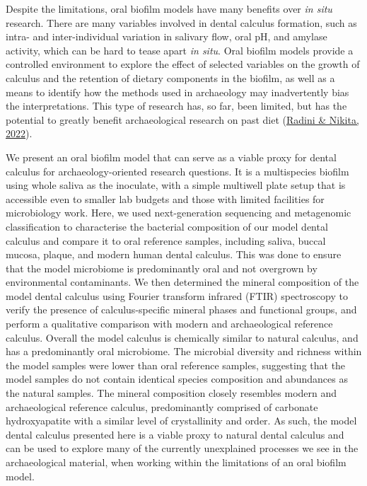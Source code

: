 \documentclass[
  b5paper,
]{book}
\begin{document}
Despite the limitations, oral biofilm models have many benefits over
\emph{in situ} research. There are many variables involved in dental
calculus formation, such as intra- and inter-individual variation in
salivary flow, oral pH, and amylase activity, which can be hard to tease
apart \emph{in situ}. Oral biofilm models provide a controlled
environment to explore the effect of selected variables on the growth of
calculus and the retention of dietary components in the biofilm, as well
as a means to identify how the methods used in archaeology may
inadvertently bias the interpretations. This type of research has, so
far, been limited, but has the potential to greatly benefit
archaeological research on past diet
(\protect\hyperlink{ref-radiniDirtyTeeth2022}{Radini \& Nikita, 2022}).

We present an oral biofilm model that can serve as a viable proxy for
dental calculus for archaeology-oriented research questions. It is a
multispecies biofilm using whole saliva as the inoculate, with a simple
multiwell plate setup that is accessible even to smaller lab budgets and
those with limited facilities for microbiology work. Here, we used
next-generation sequencing and metagenomic classification to
characterise the bacterial composition of our model dental calculus and
compare it to oral reference samples, including saliva, buccal mucosa,
plaque, and modern human dental calculus. This was done to ensure that
the model microbiome is predominantly oral and not overgrown by
environmental contaminants. We then determined the mineral composition
of the model dental calculus using Fourier transform infrared (FTIR)
spectroscopy to verify the presence of calculus-specific mineral phases
and functional groups, and perform a qualitative comparison with modern
and archaeological reference calculus. Overall the model calculus is
chemically similar to natural calculus, and has a predominantly oral
microbiome. The microbial diversity and richness within the model
samples were lower than oral reference samples, suggesting that the
model samples do not contain identical species composition and
abundances as the natural samples. The mineral composition closely
resembles modern and archaeological reference calculus, predominantly
comprised of carbonate hydroxyapatite with a similar level of
crystallinity and order. As such, the model dental calculus presented
here is a viable proxy to natural dental calculus and can be used to
explore many of the currently unexplained processes we see in the
archaeological material, when working within the limitations of an oral
biofilm model.
\end{document}
